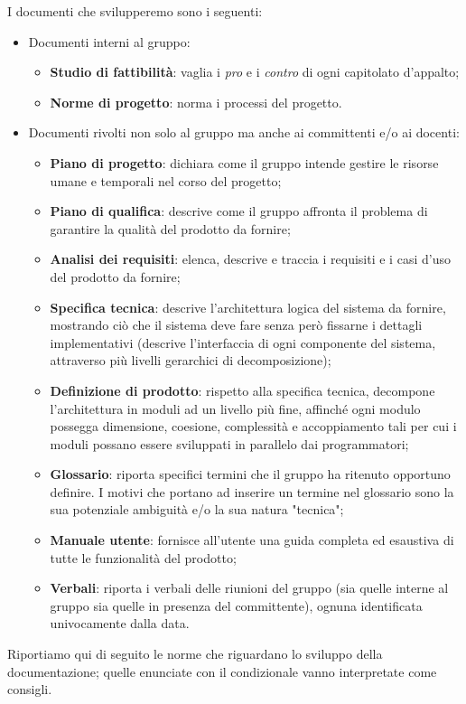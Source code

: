 I documenti che svilupperemo sono i seguenti:
\begin{itemize}
	\item Documenti interni al gruppo:
	\begin{itemize}
		\item \textbf{Studio di fattibilità}: vaglia i \emph{pro} e i \emph{contro} di ogni capitolato d'appalto;
		\item \textbf{Norme di progetto}: norma i processi del progetto.
	\end{itemize}
	\item Documenti rivolti non solo al gruppo ma anche ai committenti e/o ai docenti:
	\begin{itemize}
		\item \textbf{Piano di progetto}: dichiara come il gruppo intende gestire le risorse umane e temporali nel corso del progetto;
		\item \textbf{Piano di qualifica}: descrive come il gruppo affronta il problema di garantire la qualità del prodotto da fornire;
		\item \textbf{Analisi dei requisiti}: elenca, descrive e traccia i requisiti e i casi d'uso del prodotto da fornire;
		\item \textbf{Specifica tecnica}: descrive l'architettura logica del sistema da fornire, mostrando ciò che il sistema deve fare senza però fissarne i dettagli implementativi (descrive l'interfaccia di ogni componente del sistema, attraverso più livelli gerarchici di decomposizione);
		\item \textbf{Definizione di prodotto}: rispetto alla specifica tecnica, decompone l'architettura in moduli ad un livello più fine, affinché ogni modulo possegga dimensione, coesione, complessità e accoppiamento tali per cui i moduli possano essere sviluppati in parallelo dai programmatori;
		\item \textbf{Glossario}: riporta specifici termini che il gruppo ha ritenuto opportuno definire. I motivi che portano ad inserire un termine nel glossario sono la sua potenziale ambiguità e/o la sua natura "tecnica";
		\item \textbf{Manuale utente}: fornisce all'utente una guida completa ed esaustiva di tutte le funzionalità del prodotto;
		\item \textbf{Verbali}: riporta i verbali delle riunioni del gruppo (sia quelle interne al gruppo sia quelle in presenza del committente), ognuna identificata univocamente dalla data.
	\end{itemize}
\end{itemize}
Riportiamo qui di seguito le norme che riguardano lo sviluppo della documentazione; quelle enunciate con il condizionale vanno interpretate come consigli.

